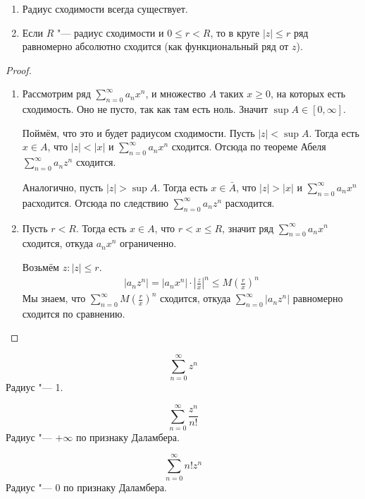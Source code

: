 \begin{theorem}
	\begin{enumerate}
	\item
		Радиус сходимости всегда существует.

	\item
		Если $R$ "--- радиус сходимости и $0 \le r < R$,
		то в круге $|z| \le r$ ряд равномерно абсолютно сходится (как функциональный ряд от $z$).
	\end{enumerate}
\end{theorem}
\begin{proof}
	\begin{enumerate}
	\item
		Рассмотрим ряд $\sum_{n=0}^\infty a_n x^n$, и множество $A$ таких $x \ge 0$, на которых есть сходимость.
		Оно не пусто, так как там есть ноль.
		Значит $\sup A \in [0, \infty]$.

		Поймём, что это и будет радиусом сходимости.
		Пусть $|z| < \sup A$.
		Тогда есть $x \in A$, что $|z| < |x|$ и $\sum_{n=0}^\infty a_n x^n$ сходится.
		Отсюда по теореме Абеля $\sum_{n=0}^\infty a_n z^n$ сходится.

		Аналогично, пусть $|z| > \sup A$.
		Тогда есть $x \in \bar A$, что $|z| > |x|$ и $\sum_{n=0}^\infty a_n x^n$ расходится.
		Отсюда по следствию $\sum_{n=0}^\infty a_n z^n$ расходится.

	\item
		Пусть $r < R$.
		Тогда есть $x \in A$, что $r < x \le R$, значит ряд $\sum_{n=0}^\infty a_n x^n$ сходится,
		откуда $a_n x^n$ ограниченно.

		Возьмём $z\colon |z| \le r$.
		\begin{gather*}
			|a_nz^n| = |a_nx^n| \cdot \left| \frac zx \right|^n \le M \left( \frac rx \right)^n
		\end{gather*}
		Мы знаем, что $\sum_{n=0}^\infty M \left( \frac rx \right)^n$ сходится,
		откуда $\sum_{n=0}^\infty |a_n z^n|$ равномерно сходится по сравнению.
	\end{enumerate}
\end{proof}

\begin{exmp}
	\[ \sum_{n=0}^\infty z^n \]
	Радиус "--- 1.
\end{exmp}

\begin{exmp}
	\[ \sum_{n=0}^\infty \frac{z^n}{n!} \]
	Радиус "--- $+\infty$ по признаку Даламбера.
\end{exmp}

\begin{exmp}
	\[ \sum_{n=0}^\infty n! z^n \]
	Радиус "--- $0$ по признаку Даламбера.
\end{exmp}


